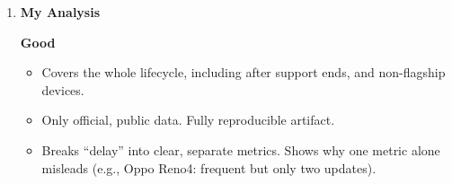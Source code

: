 \documentclass[11pt,a4paper]{article}
\newcommand{\entrypart}[1]{\textbf{\color{accent}#1}\par\vspace{2pt}}
\begin{document}
\begin{enumerate}
    \vspace{4pt}
    \textbf{Limitations (authors)}
    \begin{itemize}
        \item Samsung dataset is much larger than the others.
        \item No Oppo data for China, the US, or the UK (needs non-public device info).
        \item No data on the active user base of unpatched devices.
        \item Smaller OEMs and carriers not covered. They do not publish usable update histories.
        \item Cannot explain the reasons behind delays. Only OEMs can.
        \item OEM release date may differ from when the end user gets the update. End-user behavior out of scope.
        \item Support durations are a lower bound.
        \item Xiaomi support lists were inconsistent, so results from them were disregarded.
        \item Too few Oppo updates to analyze support types properly.
        \item Devices with no updates were excluded from overall characterization.
    \end{itemize}

    \item \entrypart{My Analysis}

    \textbf{Good}
    \begin{itemize}
        \item Covers the whole lifecycle, including after support ends, and non-flagship devices.
        \item Only official, public data. Fully reproducible artifact.
        \item Breaks ``delay'' into clear, separate metrics. Shows why one metric alone misleads (e.g., Oppo Reno4: frequent but only two updates).
    \end{itemize}


\end{enumerate}
\end{document}
